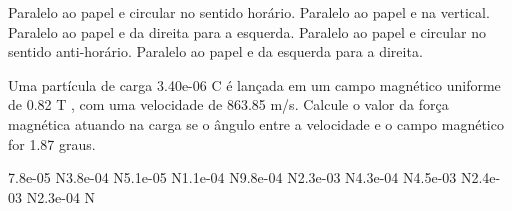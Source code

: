 \documentclass[12pt, addpoints]{exam}
\begin{document}
\begin{questions}
\begin{multicols*}{2}
\begin{choices}
\choice Paralelo ao papel e circular no sentido horário. 
\choice Paralelo ao papel e na vertical. 
\choice Paralelo ao papel e da direita para a esquerda. 
\choice Paralelo ao papel e circular no sentido anti-horário. 
\choice Paralelo ao papel e da esquerda para a direita. 
\end{choices}
\question Uma partícula de carga 3.40e-06 C é lançada em um campo magnético uniforme de    0.82 T , com uma velocidade de 863.85 m/s. Calcule o valor da força magnética atuando na carga se o ângulo entre a velocidade e o campo magnético for    1.87 graus.

\begin{oneparchoices}
\choice 7.8e-05 N\choice 3.8e-04 N\choice 5.1e-05 N\choice 1.1e-04 N\choice 9.8e-04 N\choice 2.3e-03 N\choice 4.3e-04 N\choice 4.5e-03 N\choice 2.4e-03 N\choice 2.3e-04 N
\end{oneparchoices}\end{multicols*}
\end{questions}
\newpage
\end{document}
